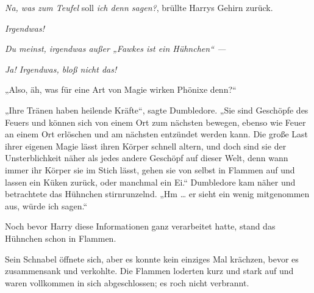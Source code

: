 \emph{Na, was zum Teufel} soll \emph{ich denn sagen?}, brüllte Harrys Gehirn zurück.

\emph{Irgendwas!}

\emph{Du meinst, irgendwas außer
„Fawkes ist ein Hühnchen“ —}

\emph{Ja! Irgendwas, bloß nicht das!}

„Also, äh, was für eine Art von Magie wirken Phönixe denn?“

„Ihre Tränen haben heilende Kräfte“, sagte Dumbledore.
„Sie sind Geschöpfe des Feuers und können sich von einem Ort zum nächsten bewegen, ebenso wie Feuer an einem Ort erlöschen und am nächsten entzündet werden kann. Die große Last ihrer eigenen Magie lässt ihren Körper schnell altern, und doch sind sie der Unsterblichkeit näher als jedes andere Geschöpf auf dieser Welt, denn wann immer ihr Körper sie im Stich lässt, gehen sie von selbst in Flammen auf und lassen ein Küken zurück, oder manchmal ein Ei.“ Dumbledore kam näher und betrachtete das Hühnchen stirnrunzelnd.
„Hm … er sieht ein wenig mitgenommen aus, würde ich sagen.“

Noch bevor Harry diese Informationen ganz verarbeitet hatte, stand das Hühnchen schon in Flammen.

Sein Schnabel öffnete sich, aber es konnte kein einziges Mal krächzen, bevor es zusammensank und verkohlte. Die Flammen loderten kurz und stark auf und waren vollkommen in sich abgeschlossen; es roch nicht verbrannt.

